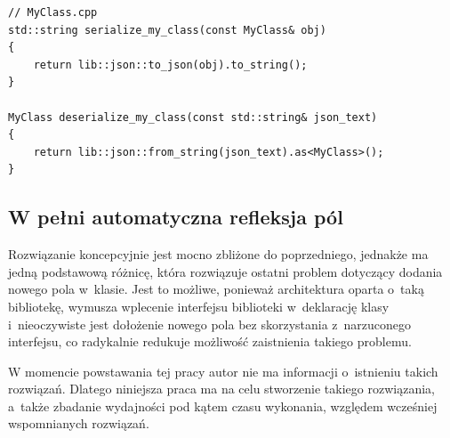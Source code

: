\documentclass[12pt]{article}
\newcommand{\n}{\newline}
\begin{document}
{{{\begin{lstlisting}[frame=single]
// MyClass.cpp
std::string serialize_my_class(const MyClass& obj)
{
	return lib::json::to_json(obj).to_string();
}

MyClass deserialize_my_class(const std::string& json_text)
{
	return lib::json::from_string(json_text).as<MyClass>();
}
				\end{lstlisting}
			}
		}

		{
			\subsection{W pełni automatyczna refleksja pól}

			Rozwiązanie koncepcyjnie jest mocno zbliżone do poprzedniego, jednakże ma jedną podstawową różnicę, która rozwiązuje ostatni
			problem dotyczący dodania nowego pola w~klasie. Jest to możliwe, ponieważ architektura oparta o~taką bibliotekę, wymusza wplecenie
			interfejsu biblioteki w~deklarację klasy i~nieoczywiste jest dołożenie nowego pola bez skorzystania z~narzuconego interfejsu, co
			radykalnie redukuje możliwość zaistnienia takiego problemu.\n

			W momencie powstawania tej pracy autor nie ma informacji o~istnieniu takich rozwiązań. Dlatego niniejsza praca ma na celu
			stworzenie takiego rozwiązania, a~także zbadanie wydajności pod kątem czasu wykonania, względem wcześniej wspomnianych rozwiązań.
		}
	}
\end{document}
